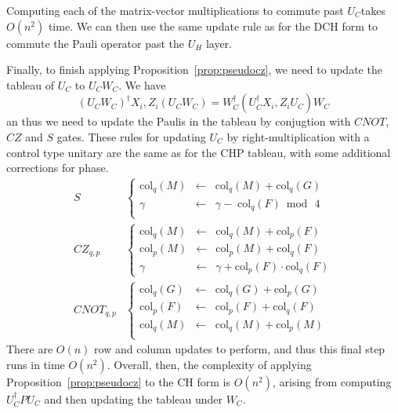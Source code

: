 Computing each of the matrix-vector multiplications to commute past $U_{C} $takes $O(n^{2})$ time. We can then use the same update rule as for the DCH form to commute the Pauli operator past the $U_{H}$ layer.\par
Finally, to finish applying Proposition~\ref{prop:pseudocz}, we need to update the tableau of $U_{C}$ to $U_{C}W_{C}$. We have
\[\left(U_{C}W_{C}\right)^{\dagger}X_{i},Z_{i}\left(U_{C}W_{C}\right) = W_{C}^{\dagger}\left(U_{C}^{\dagger}X_{i},Z_{i}U_{C}\right)W_{C}\]
an thus we need to update the Paulis in the tableau by conjugtion with $CNOT$, $CZ$ and $S$ gates. These rules for updating $U_{C}$ by right-multiplication with a control type unitary are the same as for the CHP tableau, with some additional corrections for phase.
\begin{align}
S & \left\{
\begin{array}{rcl}
\text{col}_{q}(M)  & \gets & \text{col}_{q}(M)+\text{col}_{q}(G) \\
\gamma & \gets & \gamma - \; \text{col}_{q}(F) \bmod\,4 \\
\end{array}\right. \nonumber \\
CZ_{q,p} & \left\{
\begin{array}{rcl}
\text{col}_{q}(M) & \gets & \text{col}_{q}(M) + \text{col}_{p}(F) \\
\text{col}_{p}(M) & \gets & \text{col}_{p}(M) + \text{col}_{q}(F) \\
\gamma & \gets & \gamma + \text{col}_{p}(F) \cdot \text{col}_{q}(F)
\end{array} \right. \nonumber \\ 
CNOT_{q,p} & \left\{
\begin{array}{rcl}
\text{col}_{q}(G) & \gets & \text{col}_{q}(G) + \text{col}_{p}(G)\\
\text{col}_{p}(F) & \gets & \text{col}_{p}(F) + \text{col}_{q}(F)\\
\text{col}_{q}(M) & \gets & \text{col}_{q}(M) + \text{col}_{p}(M)\\
\end{array}\right.
\end{align}
There are $O(n)$ row and column updates to perform, and thus this final step runs in time $O(n^{2})$. Overall, then, the complexity of applying Proposition~\ref{prop:pseudocz} to the CH form is $O(n^{2})$, arising from computing $U_{C}^{\dagger}PU_{C}$ and then updating the tableau under $W_{C}$.
